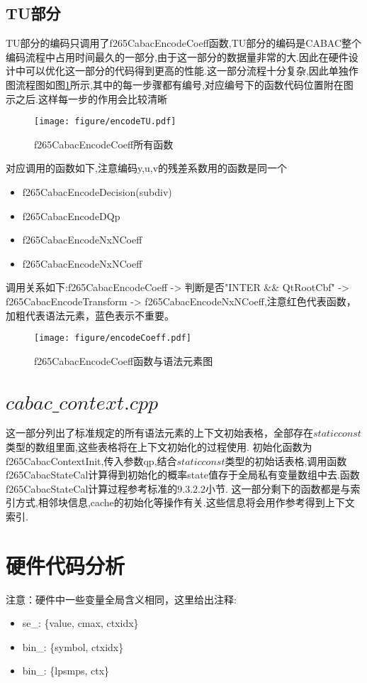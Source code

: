 \documentclass[UTF8,a4paper,12pt]{ctexart}
\begin{document}
\subsection{TU部分}
TU部分的编码只调用了f265CabacEncodeCoeff函数,TU部分的编码是CABAC整个编码流程中占用时间最久的一部分,由于这一部分的数据量非常的大.因此在硬件设计中可以优化这一部分的代码得到更高的性能.这一部分流程十分复杂,因此单独作图流程图如图\ref{fig7}所示,其中的每一步骤都有编号,对应编号下的函数代码位置附在图示之后.这样每一步的作用会比较清晰
\begin{figure}[H]
\centering
\texttt{[image: figure/encodeTU.pdf]}
\caption{f265CabacEncodeCoeff所有函数}\label{fig7}
\end{figure}
对应调用的函数如下,注意编码y,u,v的残差系数用的函数是同一个
\begin{itemize}[itemindent=25pt]
\item [1)] f265CabacEncodeDecision(subdiv)
\item [2)] f265CabacEncodeDQp
\item [3)] f265CabacEncodeNxNCoeff
\item [4)] f265CabacEncodeNxNCoeff
\end{itemize}
调用关系如下:f265CabacEncodeCoeff -> 判断是否"INTER \&\& QtRootCbf" -> f265CabacEncodeTransform -> f265CabacEncodeNxNCoeff,注意红色代表函数，加粗代表语法元素，蓝色表示不重要。
\begin{figure}[H]
\centering
\texttt{[image: figure/encodeCoeff.pdf]}
\caption{f265CabacEncodeCoeff函数与语法元素图}\label{fig8}
\end{figure}


\section{$cabac\_context.cpp$}
这一部分列出了标准规定的所有语法元素的上下文初始表格，全部存在$static const$类型的数组里面,这些表格将在上下文初始化的过程使用.
初始化函数为f265CabacContextInit,传入参数qp,结合$static const$类型的初始话表格,调用函数f265CabacStateCal计算得到初始化的概率state值存于全局私有变量数组中去.函数f265CabacStateCal计算过程参考标准\cite{ref1}的$9.3.2.2$小节.
这一部分剩下的函数都是与索引方式,相邻块信息,cache的初始化等操作有关.这些信息将会用作参考得到上下文索引.

\section{硬件代码分析}
注意：硬件中一些变量全局含义相同，这里给出注释:
\begin{itemize}[itemindent=25pt]
\item [1)] se\_: \{value, cmax, ctxidx\}
\item [2)] bin\_: \{symbol, ctxidx\}
\item [3)] bin\_: \{lpsmps, ctx\}
\end{itemize}
\end{document}
